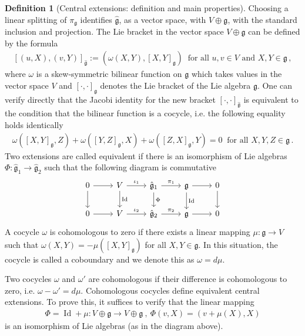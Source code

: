 \documentclass[dvipsnames]{amsart}
\theoremstyle{definition}
\newtheorem{definition}[theorem]{Definition}
\theoremstyle{definition}
\numberwithin{equation}{section}
\begin{document}
\begin{definition}[Central extensions: definition and main properties]
Choosing a linear splitting of $\pi_{\mathfrak g}$
identifies $\hat{\mathfrak g}$, as a vector space,
with $V\oplus\mathfrak g$, with the standard inclusion
and projection. The Lie bracket in the vector space $V\oplus\mathfrak{g}$ can be defined by the formula
    \begin{align*}
        \left[(u,X),(v,Y)\right]_{\hat{\mathfrak{g}}}:=\left(\omega(X,Y),[X,Y]_{\mathfrak{g}}\right)\ \text{ for all }u,v\in V\text{ and }X,Y\in\mathfrak{g}\,,
    \end{align*}
    where $\omega$ is a skew-symmetric bilinear function on $\mathfrak{g}$ which takes values in the vector space $V$ and $[\cdot,\cdot]_{\mathfrak{g}}$ denotes the Lie bracket of the Lie algebra $\mathfrak{g}$. One can verify directly that the Jacobi identity for the new bracket $[\cdot,\cdot]_{\hat{\mathfrak{g}}}$ is equivalent to the condition that the bilinear function is a cocycle, i.e. the following equality holds identically
    \begin{align*}
        \omega([X,Y]_{\mathfrak{g}},Z)+\omega([Y,Z]_{\mathfrak{g}},X)+\omega([Z,X]_{\mathfrak{g}},Y)=0\ \text{ for all }X,Y,Z\in\mathfrak{g}\,.
    \end{align*}
    Two extensions are called equivalent if there is an isomorphism of Lie algebras $\Phi\colon\hat{\mathfrak{g}}_1\longrightarrow\hat{\mathfrak{g}}_2$ such that the following diagram is commutative
    \[
\begin{tikzcd}
0 \arrow[r, " "] \arrow[d, " "] 
  & V \arrow[d, "\operatorname{Id}"]\arrow[r, " \iota_1"] & \hat{\mathfrak{g}}_1 \arrow[d, "\Phi" ]\arrow[r, "\pi_1"] & \mathfrak{g} \arrow[d, "\operatorname{Id}"]\arrow[r, " "] & 0\arrow[d," "]\\
0 \arrow[r, " "] 
  & V\arrow[r, " \iota_2"] & \hat{\mathfrak{g}}_2\arrow[r, "\pi_2"]  & \mathfrak{g} \arrow[r, " "] & 0
\end{tikzcd}
\]
A cocycle $\omega$ is cohomologous to zero if there exists a linear mapping $\mu\colon\mathfrak{g}\longrightarrow V$ such that $\omega(X,Y)=-\mu([X,Y]_{\mathfrak{g}})$ for all $X,Y\in\mathfrak{g}$. In this situation, the cocycle is called a coboundary and we denote this as $\omega=d\mu$. 

Two cocycles $\omega$ and $\omega'$ are cohomologous if their difference is cohomologous to zero, i.e. $\omega-\omega'=d\mu$. Cohomologous cocycles define equivalent central extensions. To prove this, it suffices to verify that the linear mapping 
\begin{align*}
    \Phi=\operatorname{Id}+\mu\colon V\oplus\mathfrak{g}\longrightarrow V\oplus\mathfrak{g}\ ,\ \Phi(v,X)=\left(v+\mu(X),X\right)
\end{align*}
is an isomorphism of Lie algebras (as in the diagram above).
\end{definition}
\end{document}
